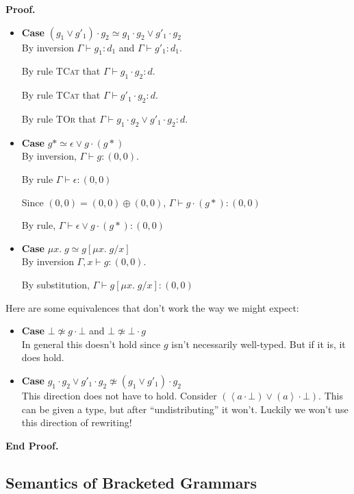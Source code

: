 \documentclass{article}
\newcommand{\fix}[2]{\mu {#1}.\;{#2}}
\newcommand{\lft}[1]{\left<{#1}\right.}
\newcommand{\rgt}[1]{\left.{#1}\right>}
\newcommand{\judgebalance}[3][\Gamma]{{#1} \vdash {#2} : {#3}}
\newcommand{\combine}[2]{{#1} \oplus {#2}}
\newcommand{\zero}{(0,0)}
\newenvironment{proof}{\noindent\textbf{Proof.}}{\noindent\textbf{End Proof.}}
\newenvironment{caseblock}{\begin{itemize}}{\end{itemize}}
\newenvironment{case}[1]{\item \textbf{Case} {#1}\\}{}
\begin{document}
\begin{proof}
\begin{caseblock}
\begin{case}{$(g_1 \vee g'_1)\cdot g_2 \simeq g_1\cdot g_2 \vee g'_1\cdot g_2$}
      By inversion $\judgebalance{g_1}{d_1}$ and $\judgebalance{g'_1}{d_1}$.

      By rule \textsc{TCat} that $\judgebalance{g_1\cdot g_2}{d}$. 

      By rule \textsc{TCat} that $\judgebalance{g'_1\cdot g_2}{d}$. 

      By rule \textsc{TOr} that $\judgebalance{g_1\cdot g_2 \vee g'_1\cdot g_2}{d}$. 
    \end{case}

    \begin{case}{$g* \simeq \epsilon \vee g\cdot(g*)$}
      By inversion, $\judgebalance{g}{\zero}$. 

      By rule $\judgebalance{\epsilon}{\zero}$

      Since $\zero = \combine{\zero}{\zero}$, $\judgebalance{g\cdot(g*)}{\zero}$
      
      By rule, $\judgebalance{\epsilon \vee g\cdot(g*)}{\zero}$
    \end{case}

    \begin{case}{$\fix{x}{g} \simeq g[\fix{x}{g}/x]$}
      By inversion $\judgebalance[\Gamma, x]{g}{\zero}$. 

      By substitution, $\judgebalance{g[\fix{x}{g}/x]}{\zero}$
    \end{case}
  \end{caseblock}

  Here are some equivalences that don't work the way we might expect: 
  \begin{caseblock}
    \begin{case}{$\bot \not\simeq g \cdot \bot$ and $\bot \not\simeq \bot \cdot g$}
      In general this doesn't hold since $g$ isn't necessarily well-typed. But if it is,
      it does hold. 
    \end{case}

    \begin{case}{$g_1\cdot g_2 \vee g'_1\cdot g_2 \not\simeq (g_1 \vee g'_1)\cdot g_2$}
      This direction does not have to hold. Consider $(\lft{a}\cdot\bot) \vee (\rgt{a}\cdot\bot)$. 
      This can be given a type, but after ``undistributing'' it won't. Luckily we won't
      use this direction of rewriting!
    \end{case}
  \end{caseblock}
\end{proof}

\subsection{Semantics of Bracketed Grammars}
\end{document}
